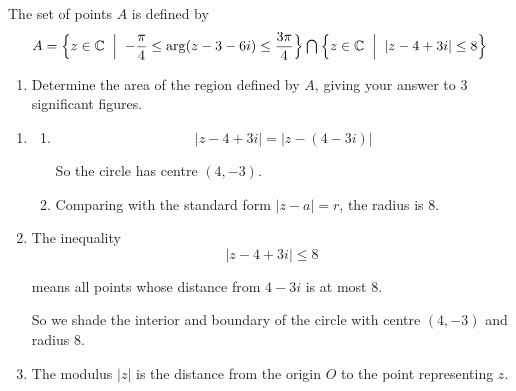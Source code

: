 \documentclass[leqno]{article}
\begin{document}
\begin{enumerate}[
  label=\textbf{\arabic*.},
  leftmargin=*,
  topsep=0pt,
  partopsep=0pt,
  parsep=0pt
]
The set of points $A$ is defined by
\[
A=
\Bigl\{ z\in\mathbb{C}\;\Bigm|\; -\frac{\pi}{4}\le \arg(z-3-6i)\le \frac{3\pi}{4} \Bigr\}
\mathbin{\textstyle\bigcap}
\Bigl\{ z\in\mathbb{C}\;\Bigm|\; \lvert z-4+3i\rvert \le 8 \Bigr\}
\]

\begin{enumerate}[label=\textbf{(\alph*)}, resume]
  \item Determine the area of the region defined by $A$, giving your answer to 3 significant figures.  \\
\end{enumerate}

\vspace*{10pt}

\begin{djsSolution}
\begin{enumerate}[label=\textbf{(\alph*)}]
  \item
  \begin{enumerate}[label=(\roman*)]
    \item
    \[
    |z-4+3i|=|z-(4-3i)|
    \]

    So the circle has centre \((4,-3)\).

    \item
    Comparing with the standard form \(|z-a|=r\), the radius is \(8\).
  \end{enumerate}

  \item
  The inequality
  \[
  |z-4+3i|\le 8
  \]

  means all points whose distance from \(4-3i\) is at most \(8\).

  So we shade the interior and boundary of the circle with centre \((4,-3)\) and radius \(8\).

  \begin{center}
  \end{center}

  \item
  The modulus \(|z|\) is the distance from the origin \(O\) to the point representing \(z\).


\end{enumerate}
\end{djsSolution}
\end{enumerate}
\end{document}
